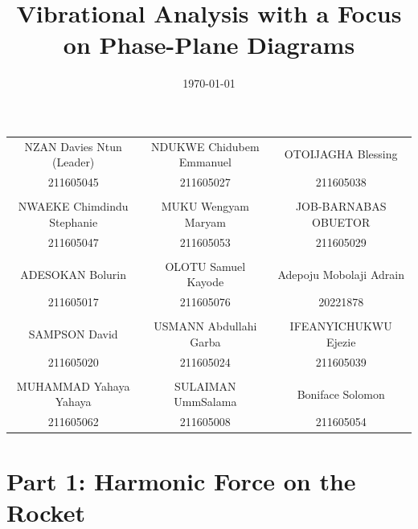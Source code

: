 \documentclass[12pt,a4paper]{article}
\title{\textbf{Vibrational Analysis with a Focus on Phase-Plane Diagrams}}
\date{\today}
\begin{document}
\maketitle

\begin{center}
    \small
    \begin{tabular}{c c c}
        NZAN Davies Ntun (Leader) & NDUKWE Chidubem Emmanuel & OTOIJAGHA Blessing \\
        211605045 & 211605027 & 211605038 \\
        & & \\
        NWAEKE Chimdindu Stephanie & MUKU Wengyam Maryam & JOB-BARNABAS OBUETOR \\
        211605047 & 211605053 & 211605029 \\
        & & \\
        ADESOKAN Bolurin & OLOTU Samuel Kayode & Adepoju Mobolaji Adrain \\
        211605017 & 211605076 & 20221878 \\
        & & \\
        SAMPSON David & USMANN Abdullahi Garba & IFEANYICHUKWU Ejezie \\
        211605020 & 211605024 & 211605039 \\
        & & \\
        MUHAMMAD Yahaya Yahaya & SULAIMAN UmmSalama & Boniface Solomon \\
        211605062 & 211605008 & 211605054 \\
    \end{tabular}
\end{center}

\tableofcontents
\newpage

\section{Part 1: Harmonic Force on the Rocket}
\end{document}
